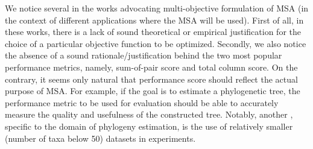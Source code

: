 We notice several  in the works advocating multi-objective formulation of MSA (in the context of different applications where the MSA will be used). First of all, in these works, there is a lack of sound theoretical or empirical justification for the choice of a particular objective function to be optimized. Secondly, we also notice the absence of a sound rationale/justification behind the two most popular performance metrics, namely, sum-of-pair score and total column score. On the contrary, it seems only natural that performance score should reflect the actual purpose of MSA. For example, if the goal is to estimate a phylogenetic tree, the performance metric to be used for evaluation should be able to accurately measure the quality and usefulness of the constructed tree. Notably, another , specific to the domain of phylogeny estimation, is the use of relatively smaller (number of taxa below 50) datasets in experiments. 

